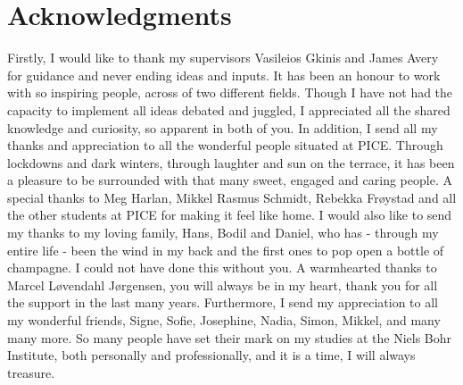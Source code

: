 \documentclass[11pt]{memoir} %
\begin{document}
\section*{Acknowledgments}
\label{Acknowledgments}
Firstly, I would like to thank my supervisors Vasileios Gkinis and James Avery for guidance and never ending ideas and inputs. It has been an honour to work with so inspiring people, across of two different fields. Though I have not had the capacity to implement all ideas debated and juggled, I appreciated all the shared knowledge and curiosity, so apparent in both of you. In addition, I send all my thanks and appreciation to all the wonderful people situated at PICE. Through lockdowns and dark winters, through laughter and sun on the terrace, it has been a pleasure to be surrounded with that many sweet, engaged and caring people. A special thanks to Meg Harlan, Mikkel Rasmus Schmidt, Rebekka Frøystad and all the other students at PICE for making it feel like home. I would also like to send my thanks to my loving family, Hans, Bodil and Daniel, who has - through my entire life - been the wind in my back and the first ones to pop open a bottle of champagne. I could not have done this without you. A warmhearted thanks to Marcel Løvendahl Jørgensen, you will always be in my heart, thank you for all the support in the last many years. Furthermore, I send my appreciation to all my wonderful friends, Signe, Sofie, Josephine, Nadia, Simon, Mikkel, and many many more. 
So many people have set their mark on my studies at the Niels Bohr Institute, both personally and professionally, and it is a time, I will always treasure. 

\newpage
\end{document}
